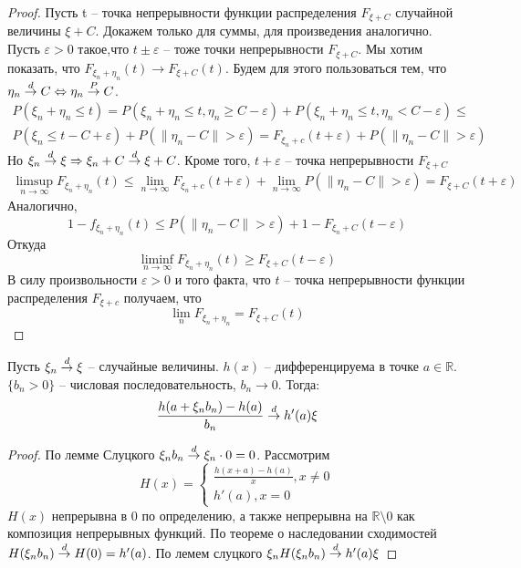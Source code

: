 \documentclass[document.tex]{subfiles}
\begin{document}
\begin{proof}
	Пусть t -- точка непрерывности функции распределения $F_{\xi+C}$ случайной величины $\xi + C$. Докажем только для суммы, для произведения аналогично.
	Пусть $\varepsilon > 0$ такое,что $t \pm \varepsilon$ -- тоже точки непрерывности $F_{\xi + C}$. Мы хотим показать, что $F_{\xi_n+\eta_n}(t) \rightarrow F_{\xi+C}(t)$.
	Будем для этого пользоваться тем, что $\eta_n \stackrel{d}{\rightarrow} C \Leftrightarrow \eta_n \stackrel{P}{\rightarrow} C$. 
	\begin{multline*}
		P(\xi_n + \eta_n \leq t) = P(\xi_n + \eta_n \leq t, \eta_n \geq C - \varepsilon) + P(\xi_n + \eta_n \leq t, \eta_n < C - \varepsilon) \leq \\
		P(\xi_n \leq t - C + \varepsilon) + P(\|\eta_n - C\| > \varepsilon) = F_{\xi_n + c}(t + \varepsilon) + P(\|\eta_n - C\| > \varepsilon)
	\end{multline*}
	Но $\xi_n \stackrel{d}{\rightarrow} \xi \Rightarrow \xi_n + C \stackrel{d}{\rightarrow} \xi + C$. Кроме того, $t + \varepsilon$ -- точка непрерывности $F_{\xi + C}$
	\begin{multline*}
		\limsup_{n \rightarrow \infty} F_{\xi_n + \eta_n}(t) \leq \lim_{n \rightarrow \infty} F_{\xi_n + c}(t + \varepsilon) + \lim_{n \rightarrow \infty} P(\|\eta_n - C\| > \varepsilon) = F_{\xi + C}(t + \varepsilon)
	\end{multline*}
	Аналогично,
	$$1 - f_{\xi_n + \eta_n}(t) \leq P(\|\eta_n - C\| > \varepsilon) + 1 - F_{\xi_n + C}(t - \varepsilon)$$
	Откуда
	$$\liminf_{n \rightarrow \infty} F_{\xi_n + \eta_n}(t) \geq F_{\xi + C}(t - \varepsilon)$$
	В силу произвольности $\varepsilon > 0$ и того факта, что $t$ -- точка непрерывности функции распределения $F_{\xi + c}$ получаем, что
	$$\lim_n F_{\xi_n + \eta_n} = F_{\xi + C}(t)$$

\end{proof}

\begin{statement}
	Пусть $\xi_n \stackrel{d}{\rightarrow} \xi$ -- случайные величины. $h(x)$ -- дифференцируема в точке $a \in \mathbb{R}$. $\{b_n > 0\}$ -- числовая последовательность, $b_n \rightarrow 0$. Тогда:
	$$\frac{h(a + \xi_n b_n) - h(a)}{b_n} \stackrel{d}{\rightarrow} h'(a) \xi$$
\end{statement}

\begin{proof}
	По лемме Слуцкого $\xi_n b_n \stackrel{d}{\rightarrow} \xi_n \cdot 0 = 0$.
	Рассмотрим 
	$$H(x) = \begin{cases}
		\frac{h(x+a) - h(a)}{x}, x \not= 0 \\
		h'(a), x = 0
	\end{cases}$$
	$H(x)$ непрерывна в 0 по определению, а также непрерывна на $\mathbb{R}\setminus 0$ как композиция непрерывных функций. По теореме о наследовании сходимостей
	$H(\xi_n b_n) \stackrel{d}{\rightarrow} H(0) = h'(a)$. По лемем слуцкого $\xi_n H(\xi_n b_n) \stackrel{d}{\rightarrow} h'(a) \xi$
\end{proof}
\end{document}
